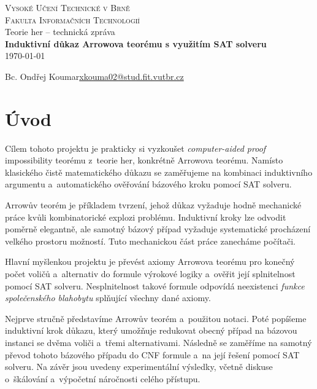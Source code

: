 \documentclass[a4paper, 11pt]{article}
\begin{document}
\begin{titlepage}
    \begin{center}
        {\Huge
            \textsc{Vysoké Učení Technické v Brně}\\[0.5em]}
        {\huge
            \textsc{Fakulta Informačních Technologií}}\\
        {\LARGE
            Teorie her -- technická zpráva\\[0.8em]
            \textbf{Induktivní důkaz Arrowova teorému s využitím SAT solveru}}\\[2em]
        \Large\today\\
    \end{center}
    {\Large
    Bc. Ondřej Koumar\hfill\href{mailto:xkouma02@stud.fit.vutbr.cz}{xkouma02@stud.fit.vutbr.cz}}
\end{titlepage}

\section{Úvod}\label{sec:Introduction}

Cílem tohoto projektu je prakticky si vyzkoušet \emph{computer-aided proof} impossibility teorému z~teorie her, konkrétně Arrowova teorému.
Namísto klasického čistě matematického důkazu se zaměřujeme na kombinaci induktivního argumentu a~automatického ověřování bázového kroku pomocí SAT solveru.

Arrowův teorém je příkladem tvrzení, jehož důkaz vyžaduje hodně mechanické práce kvůli kombinatorické explozi problému.
Induktivní kroky lze odvodit poměrně elegantně, ale samotný bázový případ vyžaduje systematické procházení velkého prostoru možností.
Tuto mechanickou část práce zanecháme počítači.

Hlavní myšlenkou projektu je převést axiomy Arrowova teorému pro konečný počet voličů a~alternativ do formule výrokové logiky a~ověřit její splnitelnost pomocí SAT solveru.
Nesplnitelnost takové formule odpovídá neexistenci \emph{funkce společenského blahobytu} splňující všechny dané axiomy.

Nejprve stručně představíme Arrowův teorém a~použitou notaci.
Poté popíšeme induktivní krok důkazu, který umožňuje redukovat obecný případ na bázovou instanci se dvěma voliči a~třemi alternativami.
Následně se zaměříme na samotný převod tohoto bázového případu do CNF formule a~na její řešení pomocí SAT solveru.
Na závěr jsou uvedeny experimentální výsledky, včetně diskuse o~škálování a~výpočetní náročnosti celého přístupu.
\end{document}
